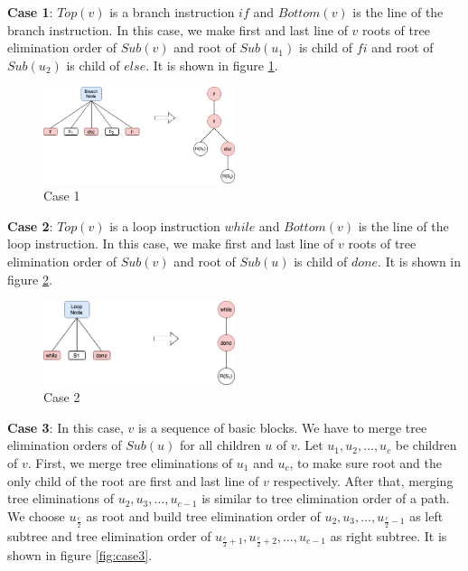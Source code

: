 \documentclass[a4paper,11.5pt,oneside]{article}
\begin{document}
\textbf{Case 1}: $Top(v)$ is a branch instruction $if$ and $Bottom(v)$ is the line of the branch instruction.
In this case, we make first and last line of $v$ roots of tree elimination order of $Sub(v)$ and root of $Sub(u_1)$ is child of $fi$ and root of $Sub(u_2)$ is child of $else$. It is shown in figure \ref{fig:case1}.

\begin{figure}[!ht]
\centering
\includegraphics[width=0.5\textwidth]{case1.jpg}
\caption{Case 1}
\label{fig:case1}
\end{figure}

\textbf{Case 2}: $Top(v)$ is a loop instruction $while$ and $Bottom(v)$ is the line of the loop instruction.
In this case, we make first and last line of $v$ roots of tree elimination order of $Sub(v)$ and root of $Sub(u)$ is child of $done$. It is shown in figure \ref{fig:case2}.

\begin{figure}[!ht]
\centering
\includegraphics[width=0.5\textwidth]{case2.jpg}
\caption{Case 2}
\label{fig:case2}
\end{figure}

\textbf{Case 3}: In this case, $v$ is a sequence of basic blocks. 
We have to merge tree elimination orders of $Sub(u)$ for all children $u$ of $v$.
Let $u_1, u_2, \dots, u_c$ be children of $v$. First, we merge tree eliminations of $u_1$ and $u_c$, to make sure root and the only child of the root are first and last line of $v$ respectively.
After that, merging tree eliminations of $u_2, u_3, \dots, u_{c-1}$ is similar to tree elimination order of a path. We choose $u_{\frac{c}{2}}$ as root and build tree elimination order of $u_2, u_3, \dots, u_{\frac{c}{2}-1}$ as left subtree and tree elimination order of $u_{\frac{c}{2}+1}, u_{\frac{c}{2}+2}, \dots, u_{c-1}$ as right subtree. It is shown in figure \ref{fig:case3}.
\end{document}
